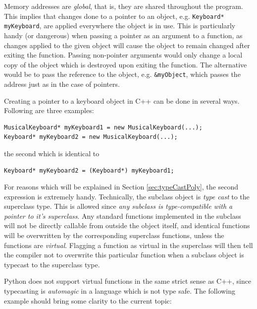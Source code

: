 Memory addresses are \textit{global}, that is, they are shared throughout the program. This implies that changes done to a pointer to an object, e.g. \verb+Keyboard* myKeyboard+, are applied everywhere the object is in use. This is particularly handy (or dangerous) when passing a pointer as an argument to a function, as changes applied to the given object will cause the object to remain changed after exiting the function. Passing non-pointer arguments would only change a local copy of the object which is destroyed upon exiting the function. The alternative would be to pass the reference to the object, e.g. \verb+&myObject+, which passes the address just as in the case of pointers. 

Creating a pointer to a keyboard object in C++ can be done in several ways. Following are three examples: 
\begin{lstlisting}
MusicalKeyboard* myKeyboard1 = new MusicalKeyboard(...);
Keyboard* myKeyboard2 = new MusicalKeyboard(...);
\end{lstlisting}

the second which is identical to 

\begin{lstlisting}
Keyboard* myKeyboard2 = (Keyboard*) myKeyboard1;
\end{lstlisting}

For reasons which will be explained in Section \ref{sec:typeCastPoly}, the second expression is extremely handy. Technically, the subclass object is \textit{type cast} to the superclass type. This is allowed since \textit{any subclass is type-compatible with a pointer to it's superclass}. Any standard functions implemented in the subclass will not be directly callable from outside the object itself, and identical functions will be overwritten by the corresponding superclass functions, unless the functions are \textit{virtual}. Flagging a function as virtual in the superclass will then tell the compiler not to overwrite this particular function when a subclass object is typecast to the superclass type.

Python does not support virtual functions in the same strict sense as C++, since typecasting is \textit{automagic} in a language which is not type safe. The following example should bring some clarity to the current topic:

\vspace{0.5 cm}

\clearpage


